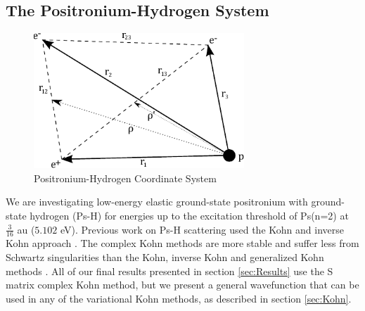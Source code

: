 \documentclass[preprint,showpacs,preprintnumbers,amsmath,amssymb]{revtex4}
\begin{document}
\subsection{The Positronium-Hydrogen System}
\begin{figure}[!h]
	\centering
	\includegraphics[height=2in]{PsHCoordinates}
	\caption{Positronium-Hydrogen Coordinate System}
	\label{fig:PsHCoords}
\end{figure}

We are investigating low-energy elastic ground-state positronium with ground-state hydrogen (Ps-H) for energies up to the excitation threshold of Ps(n=2) at $\tfrac{3}{16}$ au ($5.102$ eV). Previous work on Ps-H scattering used the Kohn and inverse Kohn approach \cite{VanReeth2003, VanReeth2004}. The complex Kohn methods are more stable and suffer less from Schwartz singularities than the Kohn, inverse Kohn and generalized Kohn methods \cite{Cooper2010}. All of our final results presented in section \ref{sec:Results} use the S matrix complex Kohn method, but we present a general wavefunction that can be used in any of the variational Kohn methods, as described in section \ref{sec:Kohn}.
\end{document}
